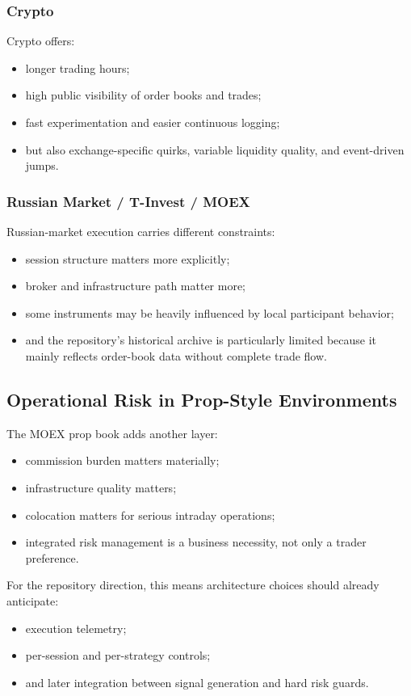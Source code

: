 \subsubsection{Crypto}

Crypto offers:
\begin{itemize}
  \item longer trading hours;
  \item high public visibility of order books and trades;
  \item fast experimentation and easier continuous logging;
  \item but also exchange-specific quirks, variable liquidity quality, and event-driven jumps.
\end{itemize}

\subsubsection{Russian Market / T-Invest / MOEX}

Russian-market execution carries different constraints:
\begin{itemize}
  \item session structure matters more explicitly;
  \item broker and infrastructure path matter more;
  \item some instruments may be heavily influenced by local participant behavior;
  \item and the repository's historical archive is particularly limited because it mainly reflects order-book data without complete trade flow.
\end{itemize}

\subsection{Operational Risk in Prop-Style Environments}

The MOEX prop book adds another layer:
\begin{itemize}
  \item commission burden matters materially;
  \item infrastructure quality matters;
  \item colocation matters for serious intraday operations;
  \item integrated risk management is a business necessity, not only a trader preference.
\end{itemize}

For the repository direction, this means architecture choices should already anticipate:
\begin{itemize}
  \item execution telemetry;
  \item per-session and per-strategy controls;
  \item and later integration between signal generation and hard risk guards.
\end{itemize}
